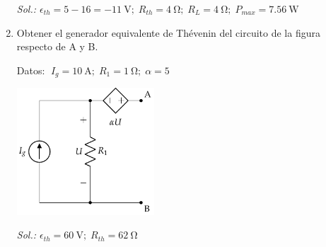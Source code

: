 \begin{enumerate}
    \emph{Sol.:\;
      $\epsilon_{th}=5-16=\qty{-11}{\volt};\; R_{th}=\qty{4}{\ohm};\;
      R_L=\qty{4}{\ohm};\;P_{max}=\qty{7.56}{\watt}$}


  \item Obtener el generador equivalente de Thévenin del circuito de la figura respecto de A y B.
  
    Datos: $\; I_g=\qty{10}{\ampere};\; R_1=\qty{1}{\ohm};\; \alpha=5$
    \begin{center}
      \includegraphics[height=4.75cm]{../figs/Thevenin1.pdf}
    \end{center}

    \emph{Sol.:\; $\epsilon_{th}=\qty{60}{\volt};\; R_{th}=\qty{62}{\ohm}$}



      

      


\end{enumerate}
